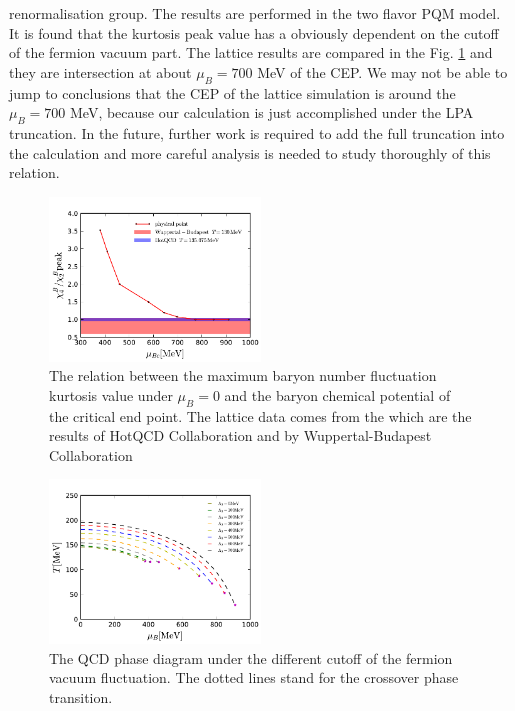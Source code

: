 \documentclass[%
reprint,
superscriptaddress,
showpacs,preprintnumbers,
 amsmath,amssymb,
 aps,
prd,
]{revtex4-1}
\begin{document}
renormalisation group. The results are performed in the two flavor PQM model. It is found that the kurtosis peak value has a obviously dependent on the cutoff of the fermion vacuum part. The lattice results are compared in the Fig. \ref{fig:cp} and they are intersection at about $\mu_B=700$ MeV of the CEP. We may not be able to jump to conclusions that the CEP of the lattice simulation is around the $\mu_B=700$ MeV, because our calculation is just accomplished under the LPA truncation. In the future, further work is required to add the full truncation into the calculation and more careful analysis is needed to study thoroughly of this relation.
%
\begin{figure}[t]
\includegraphics[width=0.5\textwidth]{cp}
\caption{The relation between the maximum baryon number fluctuation kurtosis value under $\mu_B=0$ and the baryon chemical potential of the critical end point. The lattice data comes from the \cite{Bazavov:2017dus,Bazavov:2017tot} which are the results of HotQCD Collaboration and \cite{Borsanyi:2013hza} by Wuppertal-Budapest Collaboration}\label{fig:cp}
\end{figure}
%
%
\begin{figure}[t]
\includegraphics[width=0.5\textwidth]{phasediagram}
\caption{The QCD phase diagram under the different cutoff of the fermion vacuum fluctuation. The dotted lines stand for the crossover phase transition.}\label{fig:pd}
\end{figure}
%
\end{document}
